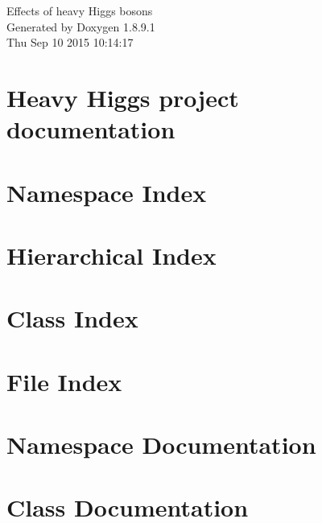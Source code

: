 \documentclass[twoside]{book}
\newcommand{\+}{\discretionary{\mbox{\scriptsize$\hookleftarrow$}}{}{}}
\newcommand{\clearemptydoublepage}{%
  \newpage{\pagestyle{empty}\cleardoublepage}%
}
\begin{document}
\hypersetup{pageanchor=false,
             bookmarks=true,
             bookmarksnumbered=true,
             pdfencoding=unicode
            }
\begin{titlepage}
\vspace*{7cm}
\begin{center}%
{\Large Effects of heavy Higgs bosons }\\
\vspace*{1cm}
{\large Generated by Doxygen 1.8.9.1}\\
\vspace*{0.5cm}
{\small Thu Sep 10 2015 10:14:17}\\
\end{center}
\end{titlepage}
\clearemptydoublepage
\tableofcontents
\clearemptydoublepage
{}
\hypersetup{pageanchor=true}

\chapter{Heavy Higgs project documentation}
\label{index}\hypertarget{index}{}
\chapter{Namespace Index}

\chapter{Hierarchical Index}

\chapter{Class Index}

\chapter{File Index}

\chapter{Namespace Documentation}



\chapter{Class Documentation}


























\end{document}
